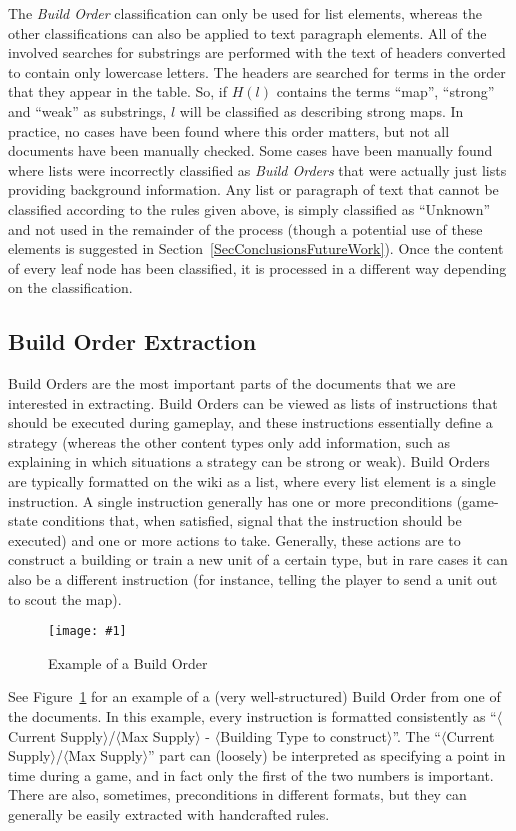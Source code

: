 \documentclass[]{article}
\newcommand{\insertfigureoriginalsize}[3]{ 
	\begin{figure}[#3]
	\begin{center}
	\texttt{[image: \#1]}
	\caption{#2}
	\label{#1}
	\end{center}
	\end{figure}
}
\newcommand{\reffigure}[1]{Figure~\ref{#1}}
\newcommand{\refsection}[1]{Section~\ref{#1}}
\begin{document}
The \emph{Build Order} classification can only be used for list elements, whereas the other classifications can also be applied to text paragraph elements. All of the involved searches for substrings are performed with the text of headers converted to contain only lowercase letters. The headers are searched for terms in the order that they appear in the table. So, if $H(l)$ contains the terms ``map'', ``strong'' and ``weak'' as substrings, $l$ will be classified as describing strong maps. In practice, no cases have been found where this order matters, but not all documents have been manually checked. Some cases have been manually found where lists were incorrectly classified as \emph{Build Orders} that were actually just lists providing background information. Any list or paragraph of text that cannot be classified according to the rules given above, is simply classified as ``Unknown'' and not used in the remainder of the process (though a potential use of these elements is suggested in \refsection{SecConclusionsFutureWork}). Once the content of every leaf node has been classified, it is processed in a different way depending on the classification.

\subsection{Build Order Extraction}
Build Orders are the most important parts of the documents that we are interested in extracting. Build Orders can be viewed as lists of instructions that should be executed during gameplay, and these instructions essentially define a strategy (whereas the other content types only add information, such as explaining in which situations a strategy can be strong or weak). Build Orders are typically formatted on the wiki as a list, where every list element is a single instruction. A single instruction generally has one or more preconditions (game-state conditions that, when satisfied, signal that the instruction should be executed) and one or more actions to take. Generally, these actions are to construct a building or train a new unit of a certain type, but in rare cases it can also be a different instruction (for instance, telling the player to send a unit out to scout the map).

\insertfigureoriginalsize{ExampleBuildOrder}{Example of a Build Order}{h}

See \reffigure{ExampleBuildOrder} for an example of a (very well-structured) Build Order from one of the documents. In this example, every instruction is formatted consistently as ``$\langle$Current Supply$\rangle$/$\langle$Max Supply$\rangle$ - $\langle$Building Type to construct$\rangle$''. The ``$\langle$Current Supply$\rangle$/$\langle$Max Supply$\rangle$'' part can (loosely) be interpreted as specifying a point in time during a game, and in fact only the first of the two numbers is important. There are also, sometimes, preconditions in different formats, but they can generally be easily extracted with handcrafted rules. 
\end{document}
